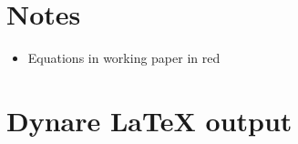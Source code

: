 \documentclass[12pt]{article}
\begin{document}
 

\section{Notes}

\begin{itemize}
\item {\color{red} Equations in working paper in red}
\end{itemize}

\section{Dynare LaTeX output}

 
 
 
 
\end{document}
